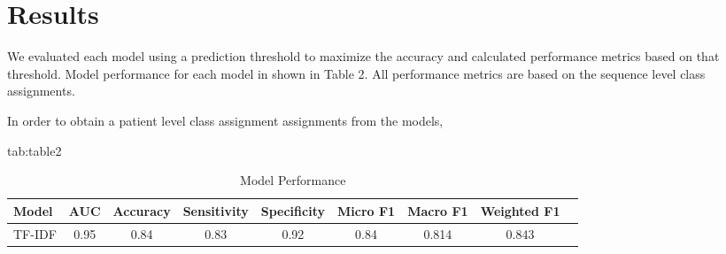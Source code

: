\documentclass[pmlr,twocolumn,10pt]{jmlr} %
\begin{document}
\section{Results}
\label{sec:Results}  

We evaluated each model using a prediction threshold to maximize the accuracy and calculated performance metrics based on that threshold. Model performance for each model in shown in Table 2. All performance metrics are based on the sequence level class assignments. %

In order to obtain a patient level class assignment assignments from the models,  %

\begin{table}[hbtp]
\floatconts
{tab:table2}
  {\begin{tabular}{lcccccccc}
    \toprule 
    \bfseries Model & \bfseries AUC & \bfseries Accuracy & \bfseries Sensitivity & \bfseries Specificity & \bfseries Micro F1  & \bfseries Macro F1 & \bfseries Weighted F1 \\ 
    \midrule
    TF-IDF & 0.95 & 0.84 & 0.83 & 0.92 & 0.84 & 0.814 & 0.843 \\
    \bottomrule
  \end{tabular}}
  {\caption{Model Performance}}
\end{table}
\end{document}
